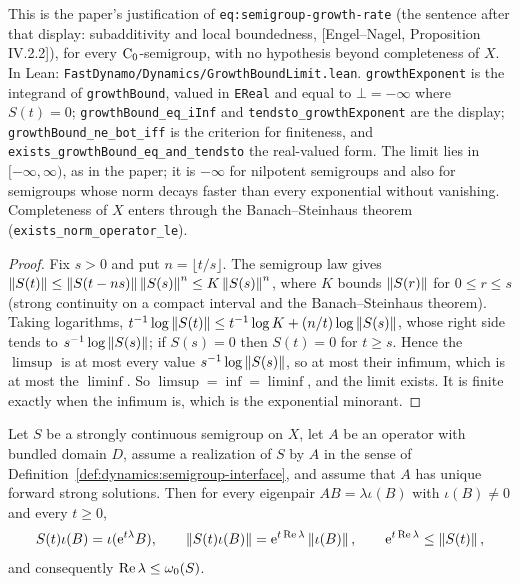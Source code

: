This is the paper's justification of \texttt{eq:semigroup-growth-rate} (the sentence after that
display: subadditivity and local boundedness, [Engel--Nagel, Proposition IV.2.2]), for every
$\mathrm{C}_0$-semigroup, with no hypothesis beyond completeness of $X$.  In Lean:
\texttt{FastDynamo/Dynamics/GrowthBoundLimit.lean}.  \texttt{growthExponent} is the integrand of
\texttt{growthBound}, valued in \texttt{EReal} and equal to $\bot=-\infty$ where $S(t)=0$;
\texttt{growthBound\_eq\_iInf} and \texttt{tendsto\_growthExponent} are the display;
\texttt{growthBound\_ne\_bot\_iff} is the criterion for finiteness, and
\texttt{exists\_growthBound\_eq\_and\_tendsto} the real-valued form.  The limit lies in
$[-\infty,\infty)$, as in the paper; it is $-\infty$ for nilpotent semigroups and also for
semigroups whose norm decays faster than every exponential without vanishing.  Completeness of
$X$ enters through the Banach--Steinhaus theorem (\texttt{exists\_norm\_operator\_le}).

\begin{proof}
  \leanok
  Fix $s>0$ and put $n=\lfloor t/s\rfloor$.  The semigroup law gives
  $\left\|S(t)\right\|\leq\left\|S(t-ns)\right\|\left\|S(s)\right\|^n\leq K\left\|S(s)\right\|^n$, where $K$ bounds
  $\left\|S(r)\right\|$ for $0\leq r\leq s$ (strong continuity on a compact interval and the
  Banach--Steinhaus theorem).  Taking logarithms,
  $t^{-1}\log\left\|S(t)\right\|\leq t^{-1}\log K+(n/t)\log\left\|S(s)\right\|$, whose right side tends to
  $s^{-1}\log\left\|S(s)\right\|$; if $S(s)=0$ then $S(t)=0$ for $t\geq s$.  Hence the $\limsup$ is
  at most every value $s^{-1}\log\left\|S(s)\right\|$, so at most their infimum, which is at most the
  $\liminf$.  So $\limsup=\inf=\liminf$, and the limit exists.  It is finite exactly when the
  infimum is, which is the exponential minorant.
\end{proof}

\begin{lemma}
  \label{lem:dynamics:conditional-growth-bound}
  \leanok
  Let $S $ be a strongly continuous semigroup on $X $, let $A $ be an operator with
  bundled domain $D $, assume a realization of $S $ by $A $ in the sense of
  Definition~\ref{def:dynamics:semigroup-interface}, and assume that $A $ has unique
  forward strong solutions.  Then for every eigenpair $AB=\lambda\iota(B) $ with
  $\iota(B)\neq0 $ and every $t\geq0 $,
  \[
    S(t)\iota(B)=\iota(\mathrm{e}^{t\lambda}B),
    \qquad
    \left\|S(t)\iota(B)\right\|=\mathrm{e}^{t\operatorname{Re}\lambda}\left\|\iota(B)\right\|,
    \qquad
    \mathrm{e}^{t\operatorname{Re}\lambda}\leq\left\|S(t)\right\|,
  \]
  and consequently $\operatorname{Re}\lambda\leq\omega_0(S) $.
\end{lemma}

